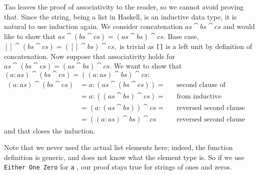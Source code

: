 Tao leaves the proof of associativity to the reader, so we cannot avoid proving that. Since the string, being a list in Haskell, is an inductive data type,
it is natural to use induction again. We consider concatenation $as \cat bs \cat cs$ and would like to show that $as \cat (bs \cat cs) = (as \cat bs) \cat cs.$
Base case, $[] \cat (bs \cat cs) = ([] \cat bs) \cat cs,$ is trivial as \texttt{[]} is a left unit by definition of concatenation.
Now suppose that associativity holds for $as \cat (bs \cat cs) = (as \cat bs) \cat cs.$ We want to show that $(a : as) \cat (bs \cat cs) = ((a : as) \cat bs) \cat cs:$
\begin{align*}
(a : as) \cat (bs \cat cs) &= a : (as \cat (bs \cat cs)) = && \text{second clause of definition} \\
                           &= a : ((as \cat bs) \cat cs) = && \text{from inductive hypothesis} \\
                           &= (a : (as \cat bs)) \cat cs = && \text{reversed second clause} \\
                           &= ((a : as) \cat bs) \cat cs && \text{reversed second clause again} 
\end{align*}
and that closes the induction.

Note that we never used the actual list elements here; indeed, the function definition is generic, and does not know what the element type is. 
So if we use \texttt{Either One Zero} for \texttt{a} , our proof stays true for strings of ones and zeros. 